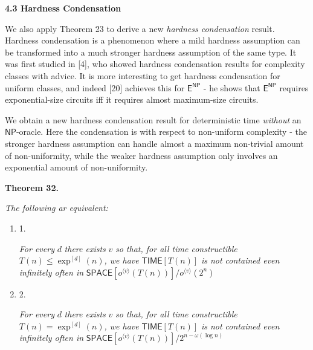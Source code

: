 \par\medskip\noindent\textbf{
4.3 Hardness Condensation}\par




We also apply Theorem 23 to derive a new \emph{hardness condensation} result. Hardness condensation is a phenomenon where a mild hardness assumption can be transformed into a much stronger hardness assumption of the same type. It was first studied in [4], who showed hardness condensation results for complexity classes with advice. It is more interesting to get hardness condensation for uniform classes, and indeed [20] achieves this for ${\mathsf{E}}^{{\mathsf{NP}}}$ - he shows that ${\mathsf{E}}^{{\mathsf{NP}}}$ requires exponential-size circuits iff it requires almost maximum-size circuits.\par




We obtain a new hardness condensation result for deterministic time \emph{without} an ${\mathsf{NP}}$-oracle. Here the condensation is with respect to non-uniform complexity - the stronger hardness assumption can handle almost a maximum non-trivial amount of non-uniformity, while the weaker hardness assumption only involves an exponential amount of non-uniformity.\par





\par\medskip\noindent\textbf{
\textbf{Theorem 32}\textbf{.}
}\par



\emph{The following ar equivalent:}\par


\begin{enumerate}


\item[] 
1. 


\emph{For every }$d$\emph{ there exists }$v$\emph{ so that, for all time constructible }$T(n)\leq\exp^{[d]}(n)$\emph{, we have }${\mathsf{TIME}}[T(n)]$\emph{ is not contained even infinitely often in }${\mathsf{SPACE}}[o^{\langle v\rangle}(T(n))]/o^{\langle v\rangle}(2^{n})$\emph{}\par





\item[] 
2. 


\emph{For every }$d$\emph{ there exists }$v$\emph{ so that, for all time constructible }$T(n)=\exp^{[d]}(n)$\emph{, we have }${\mathsf{TIME}}[T(n)]$\emph{ is not contained even infinitely often in }${\mathsf{SPACE}}[o^{\langle v\rangle}(T(n))]/2^{n-\omega(\log n)}$\emph{}\par





\end{enumerate}



